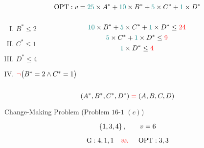 \begin{frame}{}
  \[
    \text{OPT}: v = \textcolor{teal}{25} \times A^{\ast} + \textcolor{teal}{10} \times B^{\ast} + \textcolor{teal}{5} \times C^{\ast} + \textcolor{teal}{1} \times D^{\ast}
  \]

  \vspace{0.50cm}
  \begin{columns}
      \pause
      \begin{lemma}
	\begin{enumerate}[(I)]
	  \item $B^{\ast} \le 2$
	  \item $C^{\ast} \le 1$
	  \item $D^{\ast} \le 4$
	  \item $\textcolor{red}{\lnot} \big(B^{\ast} = 2 \land C^{\ast} = 1\big)$
	\end{enumerate}
      \end{lemma}
      \pause
      \begin{theorem}
	\[
	  \textcolor{teal}{10} \times B^{\ast} + \textcolor{teal}{5} \times C^{\ast} + \textcolor{teal}{1} \times D^{\ast} \le \textcolor{red}{24}
	\]
	\[
	  \textcolor{teal}{5} \times C^{\ast} + \textcolor{teal}{1} \times D^{\ast} \le \textcolor{red}{9}
	\]
	\[
	  \textcolor{teal}{1} \times D^{\ast} \le \textcolor{red}{4}
	\]
      \end{theorem}
  \end{columns}

  \pause
  \vspace{0.80cm}
  \[
    (A^{\ast}, B^{\ast}, C^{\ast}, D^{\ast}) \;\textcolor{red}{=}\; (A, B, C, D)
  \]
\end{frame}

\begin{frame}{}
  \begin{exampleblock}{Change-Making Problem (Problem $16$-$1$ $(c)$)}

    \pause
    \[
      \left\{1, 3, 4\right\}, \qquad v = 6
    \]

    \pause
    \[
      \text{G}: 4, 1, 1 \quad \text{\textcolor{red}{\it vs. }} \quad \text{OPT}: 3, 3
    \]
  \end{exampleblock}

  \pause
  \vspace{0.30cm}
  \begin{quote}
    \centering
  \end{quote}
\end{frame}


